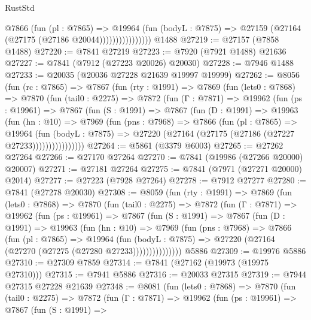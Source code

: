 \begin{lexlean}{RustStd}
\begin{coremodule}
{\begin{coremodule}
{{{{{{{{{{{{{{{{{{{{{{{{{{{{{{{{{{{{{{{{{{{{{{{{{{{{{{                        @7866
                          (fun (pl : @7865) =>
                          @19964
                            (fun (bodyL : @7875) =>
                            @27159 (@27164 (@27175 (@27186 @20044))))))))))))))))
    @1488
@27219 := @27157 (@7858 @1488)
@27220 := @7841 @27219
@27223 := @7920 (@7921 @1488) @21636
@27227 := @7841 (@7912 (@27223 @20026) @20030)
@27228 := @7946 @1488
@27233 := @20035 (@20036 @27228 @21639 @19997 @19999)
@27262 := @8056
    (fun (rc : @7865) =>
    @7867
      (fun (rty : @1991) =>
      @7869
        (fun (lets0 : @7868) =>
        @7870
          (fun (tail0 : @2275) =>
          @7872
            (fun (Γ : @7871) =>
            @19962
              (fun (ps : @19961) =>
              @7867
                (fun (S : @1991) =>
                @7867
                  (fun (D : @1991) =>
                  @19963
                    (fun (hn : @10) =>
                    @7969
                      (fun (pns : @7968) =>
                      @7866
                        (fun (pl : @7865) =>
                        @19964
                          (fun (bodyL : @7875) =>
                          @27220 (@27164 (@27175 (@27186 (@27227 @27233))))))))))))))))
@27264 := @5861 (@3379 @6003)
@27265 := @27262 @27264
@27266 := @27170 @27264
@27270 := @7841 (@19986 (@27266 @20000) @20007)
@27271 := @27181 @27264
@27275 := @7841 (@7971 (@27271 @20000) @2014)
@27277 := @27223 (@7928 @27264)
@27278 := @7912 @27277
@27280 := @7841 (@27278 @20030)
@27308 := @8059
    (fun (rty : @1991) =>
    @7869
      (fun (lets0 : @7868) =>
      @7870
        (fun (tail0 : @2275) =>
        @7872
          (fun (Γ : @7871) =>
          @19962
            (fun (ps : @19961) =>
            @7867
              (fun (S : @1991) =>
              @7867
                (fun (D : @1991) =>
                @19963
                  (fun (hn : @10) =>
                  @7969
                    (fun (pns : @7968) =>
                    @7866
                      (fun (pl : @7865) =>
                      @19964
                        (fun (bodyL : @7875) =>
                        @27220 (@27164 (@27270 (@27275 (@27280 @27233)))))))))))))))
    @5886
@27309 := @19976 @5886
@27310 := @27309 @7859
@27314 := @7841 (@27162 (@19973 (@19975 @27310)))
@27315 := @7941 @5886
@27316 := @20033 @27315
@27319 := @7944 @27315 @27228 @21639
@27348 := @8081
    (fun (lets0 : @7868) =>
    @7870
      (fun (tail0 : @2275) =>
      @7872
        (fun (Γ : @7871) =>
        @19962
          (fun (ps : @19961) =>
          @7867
            (fun (S : @1991) =>
}}}}}}}}}}}}}}}}}}}}}}}}}}}}}}}}}}}}}}}}}}}}}}}}}}}}}}
\end{coremodule}}
\end{coremodule}
\end{lexlean}
